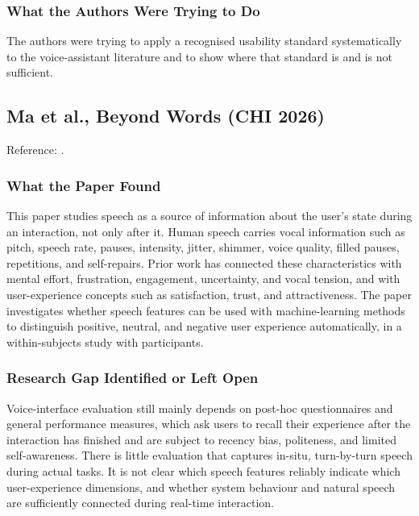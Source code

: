 \documentclass[11pt,a4paper]{report}
\begin{document}
\subsubsection{What the Authors Were Trying to Do}

The authors were trying to apply a recognised usability standard
systematically to the voice-assistant literature and to show where that
standard is and is not sufficient.

\subsection{Ma et al., Beyond Words (CHI 2026)}

\noindent Reference: \autocite{ma2026beyondwords}.

\subsubsection{What the Paper Found}

This paper studies speech as a source of information about the user's
state during an interaction, not only after it. Human speech carries
vocal information such as pitch, speech rate, pauses, intensity,
jitter, shimmer, voice quality, filled pauses, repetitions, and
self-repairs. Prior work has connected these characteristics with
mental effort, frustration, engagement, uncertainty, and vocal tension,
and with user-experience concepts such as satisfaction, trust, and
attractiveness. The paper investigates whether speech features can be
used with machine-learning methods to distinguish positive, neutral,
and negative user experience automatically, in a within-subjects study
with participants.

\subsubsection{Research Gap Identified or Left Open}

Voice-interface evaluation still mainly depends on post-hoc
questionnaires and general performance measures, which ask users to
recall their experience after the interaction has finished and are
subject to recency bias, politeness, and limited self-awareness. There
is little evaluation that captures in-situ, turn-by-turn speech during
actual tasks. It is not clear which speech features reliably indicate
which user-experience dimensions, and whether system behaviour and
natural speech are sufficiently connected during real-time interaction.
\end{document}
